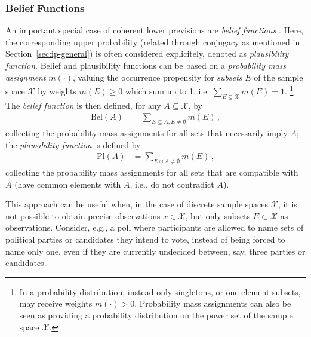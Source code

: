 
\subsubsection{Belief Functions}

An important special case of coherent lower previsions %
are \emph{belief functions} \parencite[see, e.g.,][\S 2]{itip-other}.
Here, the corresponding upper probability (related through conjugacy as mentioned in Section~\ref{sec:ip-general})
is often considered explicitely, denoted as \emph{plausibility function}.
Belief and plausibility functions can be based on a \emph{probability mass assignment} $m(\cdot)$,
valuing the occurrence propensity for \emph{subsets} $E$ of the sample space $\mathcal{X}$
by weights $m(E) \ge 0$ which sum up to 1, i.e. $\sum_{E \subseteq \mathcal{X}} m(E) = 1$.%
\footnote{In a probability distribution, instead only singletons,
or one-element subsets, may receive weights $m(\cdot) > 0$.
Probability mass assignments can also be seen as providing a probability distribution on the
power set of the sample space $\mathcal{X}$.}
The \emph{belief function} is then defined, for any $A \subseteq \mathcal{X}$, by
\begin{align*}
\text{Bel}(A) &= \sum_{E \subseteq A, E \neq \emptyset} m(E)\,,
\end{align*}
collecting the probability mass assignments for all sets that necessarily imply $A$;
the \emph{plausibility function} is defined by
\begin{align*}
\text{Pl}(A) &= \sum_{E \cap A \neq \emptyset} m(E)\,,
\end{align*}
collecting the probability mass assignments for all sets that are compatible with $A$
(have common elements with $A$, i.e., do not contradict $A$).

This approach can be useful when,
in the case of discrete sample spaces $\mathcal{X}$,
it is not possible to obtain
precise observations $x \in \mathcal{X}$,
but only subsets $E \subset \mathcal{X}$ as observations.
Consider, e.g., a poll where participants 
are allowed to name sets of political parties or candidates they intend to vote,
instead of being forced to name only one, even if they are currently undecided between, say, three parties or candidates.


